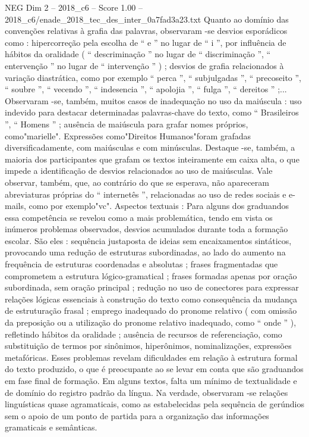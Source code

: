 \begin{textsample}{NEG Dim 2 – 2018\_c6 – Score 1.00 – 2018\_c6/enade\_2018\_tec\_des\_inter\_0a7fad3a23.txt}
Quanto ao domínio das convenções relativas à grafia das palavras, observaram -se desvios esporádicos como : hipercorreção pela escolha de “ e ” no lugar de “ i ”, por influência de hábitos da oralidade ( “ descriminação ” no lugar de “ discriminação ”, “ entervenção ” no lugar de “ intervenção ” ) ; desvios de grafia relacionados à variação diastrática, como por exemplo “ perca ”, “ subjulgadas ”, “ precoseito ”, “ soubre ”, “ vecendo ”, “ indesencia ”, “ apolojia ”, “ fulga ”, “ dereitos ” ;...
Observaram -se, também, muitos casos de inadequação no uso da maiúscula : uso indevido para destacar determinadas palavras-chave do texto, como “ Brasileiros ”, “ Homens ” ; ausência de maiúscula para grafar nomes próprios, como"marielle".
Expressões como"Direitos Humanos"foram grafadas diversificadamente, com maiúsculas e com minúsculas.
Destaque -se, também, a maioria dos participantes que grafam os textos inteiramente em caixa alta, o que impede a identificação de desvios relacionados ao uso de maiúsculas.
Vale observar, também, que, ao contrário do que se esperava, não apareceram abreviaturas próprias do “ internetês ”, relacionadas ao uso de redes sociais e e-mails, como por exemplo"vc".
Aspectos textuais : Para alguns dos graduandos essa competência se revelou como a mais problemática, tendo em vista os inúmeros problemas observados, desvios acumulados durante toda a formação escolar.
São eles : sequência justaposta de ideias sem encaixamentos sintáticos, provocando uma redução de estruturas subordinadas, ao lado do aumento na frequência de estruturas coordenadas e absolutas ; frases fragmentadas que comprometem a estrutura lógico-gramatical ; frases formadas apenas por oração subordinada, sem oração principal ; redução no uso de conectores para expressar relações lógicas essenciais à construção do texto como consequência da mudança de estruturação frasal ; emprego inadequado do pronome relativo ( com omissão da preposição ou a utilização do pronome relativo inadequado, como “ onde ” ), refletindo hábitos da oralidade ; ausência de recursos de referenciação, como substituição de termos por sinônimos, hiperônimos, nominalizações, expressões metafóricas.
Esses problemas revelam dificuldades em relação à estrutura formal do texto produzido, o que é preocupante ao se levar em conta que são graduandos em fase final de formação.
Em alguns textos, falta um mínimo de textualidade e de domínio do registro padrão da língua.
Na verdade, observaram -se relações linguísticas quase agramaticais, como as estabelecidas pela sequência de gerúndios sem o apoio de um ponto de partida para a organização das informações gramaticais e semânticas.

\end{textsample}
